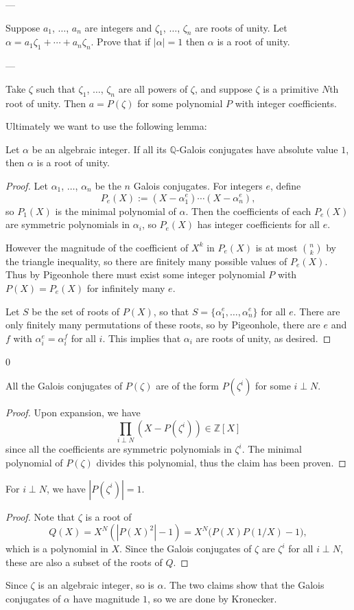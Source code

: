 
---

Suppose $a_1$, $\ldots$, $a_n$ are integers and $\zeta_1$, $\ldots$, $\zeta_n$ are roots of unity. Let $\alpha=a_1\zeta_1+\cdots+a_n\zeta_n$. Prove that if $|\alpha|=1$ then $\alpha$ is a root of unity.

---

Take $\zeta$ such that $\zeta_1$, $\ldots$, $\zeta_n$ are all powers of $\zeta$, and suppose $\zeta$ is a primitive $N$th root of unity. Then $a=P(\zeta)$ for some polynomial $P$ with integer coefficients.

Ultimately we want to use the following lemma:
\begin{boxlemma*}[Kronecker]
    Let $\alpha$ be an algebraic integer. If all its $\mathbb Q$-Galois conjugates have absolute value $1$, then $\alpha$ is a root of unity.
\end{boxlemma*}
\begin{proof}
    Let $\alpha_1$, $\ldots$, $\alpha_n$ be the $n$ Galois conjugates. For integers $e$, define \[P_e(X):=(X-\alpha_1^e)\cdots(X-\alpha_n^e),\]
    so $P_1(X)$ is the minimal polynomial of $\alpha$. Then the coefficients of each $P_e(X)$ are symmetric polynomials in $\alpha_i$, so $P_e(X)$ has integer coefficients for all $e$.

    However the magnitude of the coefficient of $X^k$ in $P_e(X)$ is at most $\binom nk$ by the triangle inequality, so there are finitely many possible values of $P_e(X)$. Thus by Pigeonhole there must exist some integer polynomial $P$ with $P(X)=P_e(X)$ for infinitely many $e$.

    Let $S$ be the set of roots of $P(X)$, so that $S=\{\alpha_1^e,\ldots,\alpha_n^e\}$ for all $e$. There are only finitely many permutations of these roots, so by Pigeonhole, there are $e$ and $f$ with $\alpha_i^e=\alpha_i^f$ for all $i$. This implies that $\alpha_i$ are roots of unity, as desired.
\end{proof}
\setcounter{iclaim}0
\begin{iclaim}
    All the Galois conjugates of $P(\zeta)$ are of the form $P(\zeta^i)$ for some $i\perp N$.
\end{iclaim}
\begin{proof}
    Upon expansion, we have \[\prod_{i\perp N}\left(X-P(\zeta^i)\right)\in\mathbb Z[X]\]
    since all the coefficients are symmetric polynomials in $\zeta^i$. The minimal polynomial of $P(\zeta)$ divides this polynomial, thus the claim has been proven.
\end{proof}
\begin{iclaim}
    For $i\perp N$, we have $|P(\zeta^i)|=1$.
\end{iclaim}
\begin{proof}
    Note that $\zeta$ is a root of \[Q(X)=X^N\left(|P(X)^2|-1\right)=X^N\big(P(X)P(1/X)-1\big),\]
    which is a polynomial in $X$. Since the Galois conjugates of $\zeta$ are $\zeta^i$ for all $i\perp N$, these are also a subset of the roots of $Q$.
\end{proof}

Since $\zeta$ is an algebraic integer, so is $\alpha$. The two claims show that the Galois conjugates of $\alpha$ have magnitude $1$, so we are done by Kronecker.

